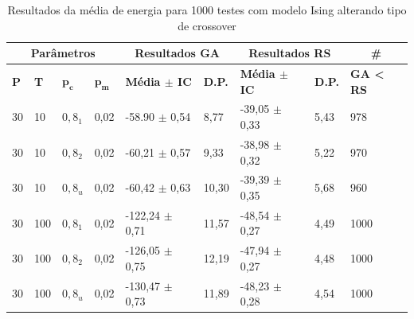 \begin{table}[htb]
	\centering
	\begin{tabular}{|l|l|l|l|l|l|l|l|l|}
		\hline
		\multicolumn{4}{|c|}{\textbf{Parâmetros}}                                                    & \multicolumn{2}{c|}{\textbf{Resultados GA}}                                        & \multicolumn{2}{c|}{\textbf{Resultados RS}}                                        & \multicolumn{1}{c|}{\textbf{\#}}                      \\ \hline
		\textbf{P} & \textbf{T} & $\bm{p_c}$ & $\bm{p_m}$ & \textbf{Média $\pm$ IC} & \textbf{D.P.} & \textbf{Média $\pm$ IC} & \textbf{D.P.} & \textbf{GA < RS} \\ \hline
	30                          & 10                          & $0,8_1$    & 0,02       & -58.90 $\pm$ 0,54                            & 8,77                           & -39,05 $\pm$ 0,33                            & 5,43                           & 978                                          \\ \hline
	30                          & 10                          & $0,8_2$    & 0,02       & -60,21 $\pm$ 0,57                            & 9,33                           & -38,98 $\pm$ 0,32                            & 5,22                           & 970                                          \\ \hline
	30                          & 10                          & $0,8_u$    & 0,02       & -60,42 $\pm$ 0,63                            & 10,30                          & -39,39 $\pm$ 0,35                            & 5,68                           & 960                                          \\ \hline
	30                          & 100                         & $0,8_1$    & 0,02       & -122,24 $\pm$ 0,71                           & 11,57                          & -48,54 $\pm$ 0,27                            & 4,49                           & 1000                                         \\ \hline
	30                          & 100                         & $0,8_2$    & 0,02       & -126,05 $\pm$ 0,75                           & 12,19                          & -47,94 $\pm$ 0,27                            & 4,48                           & 1000                                         \\ \hline
	30                          & 100                         & $0,8_u$    & 0,02       & -130,47 $\pm$ 0,73                           & 11,89                          & -48,23 $\pm$ 0,28                            & 4,54                           & 1000                                         \\ \hline
\end{tabular}
\caption{Resultados da média de energia para 1000 testes com modelo Ising alterando tipo de crossover}
\label{tab:resultados_teste2}
\end{table}

